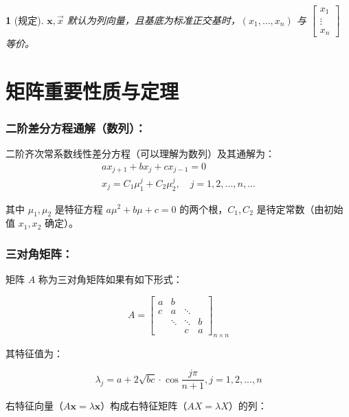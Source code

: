 \documentclass[zihao=5,UTF8]{report}
\theoremstyle{MyTheoremStyle} %
\theoremstyle{MySubsubsectionStyle} %
\newtheorem{definition}{}
\begin{document}
\begin{definition}[规定]
$\boldsymbol{x}, \vec{x}$ 默认为列向量，且基底为标准正交基时，$(x_1, ..., x_n) $ 与 $\begin{bmatrix}
    x_1 \\ \vdots \\ x_n
\end{bmatrix}$ 等价。 

\end{definition}



\section{矩阵重要性质与定理}

\subsubsection{二阶差分方程通解（数列）：}

二阶齐次常系数线性差分方程（可以理解为数列）及其通解为：
\begin{gather}
ax_{j+1}+bx_j+cx_{j-1}=0 \\ 
x_j=C_1\mu_1^j+C_2\mu_2^j,\quad j=1,2,..., n, ...
\end{gather}

其中 $\mu_1, \mu_2$ 是特征方程 $a\mu^2 + b\mu + c = 0$ 的两个根，$C_1, C_2$ 是待定常数（由初始值 $x_1, x_2$ 确定）。


\subsubsection{三对角矩阵：}

矩阵 $A$ 称为三对角矩阵如果有如下形式：


\begin{equation}
A = 
\begin{bmatrix}
    a&b\\c&a&\ddots\\&\ddots&\ddots&b\\&&c&a
\end{bmatrix}_{n \times n}
\end{equation}

其特征值为：

\begin{equation}
    \lambda_j=a+2\sqrt{bc}\cdot\cos\frac{j\pi}{n+1}, j=1,2,...,n
\end{equation}

右特征向量（$A \boldsymbol{x} = \lambda \boldsymbol{x}$）构成右特征矩阵（$AX = \lambda X$）的列：
\end{document}

